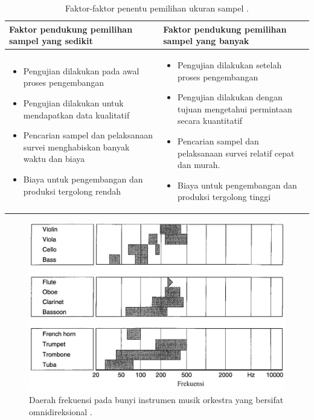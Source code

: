 \begin{table}[b!]
    \begin{center}
        \caption{Faktor-faktor penentu pemilihan ukuran sampel \cite{bukuUlrich}.}
    \end{center}
    \begin{tabular}{m{7cm} m{7cm}}
        \hline
        \textbf{Faktor pendukung pemilihan sampel yang sedikit} & \textbf{Faktor pendukung pemilihan sampel yang banyak}\\
        \hline
        \begin{itemize}
            \item Pengujian dilakukan pada awal proses pengembangan
            \item Pengujian dilakukan untuk mendapatkan data kualitatif
            \item Pencarian sampel dan pelaksanaan survei menghabiskan banyak waktu dan biaya
            \item Biaya untuk pengembangan dan produksi tergolong rendah
        \end{itemize} & \begin{itemize}
            \item Pengujian dilakukan setelah proses pengembangan
            \item Pengujian dilakukan dengan tujuan mengetahui permintaan secara kuantitatif
            \item Pencarian sampel dan pelaksanaan survei relatif cepat dan murah.
            \item Biaya untuk pengembangan dan produksi tergolong tinggi
        \end{itemize} \\
        \hline
    \end{tabular}
    \label{tab:ukuran-sampel}
\end{table}

\begin{figure}[b!]
    \centering
    \includegraphics[width= 13.3 cm]{Gambar/frek-region-omni.jpg}
    \caption{Daerah frekuensi pada bunyi instrumen musik orkestra yang bersifat omnidireksional \cite{meyer}.}
    \label{fig:reg-frek-orkestra}
\end{figure}


